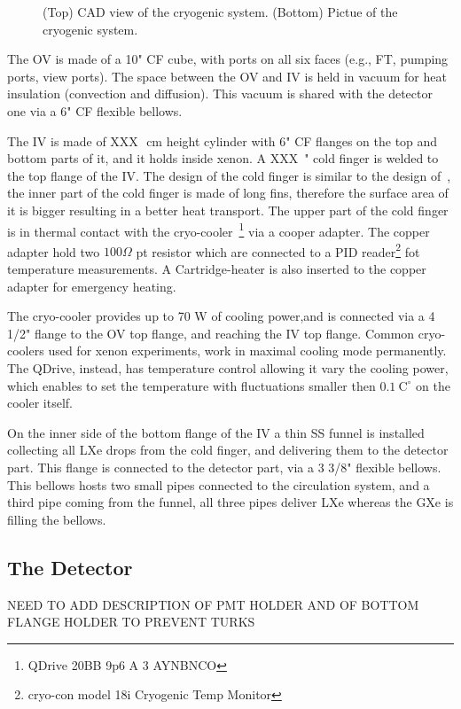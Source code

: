 \begin{figure}
\begin{subfigure}[b]{0.25\textheight}
    \end{subfigure}
        \caption{(Top) CAD view of the cryogenic system. (Bottom) Pictue of the cryogenic system. \label{fig:cryo}}
\end{figure}


The OV is made of a 10" CF cube, with ports on all six faces (e.g., FT, pumping ports, view ports). The space between the OV and IV is held in vacuum for heat insulation (convection and diffusion). This vacuum is shared with the detector one via a 6" CF flexible bellows.

The IV is made of XXX~\,cm height cylinder with 6" CF flanges on the top and bottom parts of it, and it holds inside xenon. A XXX~" cold finger is welded to the top flange of the IV. The design of the cold finger is similar to the design of~\cite{xe100_instr2012}, the inner part of the cold finger is made of long fins, therefore the surface area of it is bigger resulting in a better heat transport. The upper part of the cold finger is in thermal contact with the cryo-cooler~\footnote{QDrive 20BB 9p6 A 3 AYNBNCO} via a cooper adapter. The copper adapter hold two $100\Omega$ pt resistor which are connected to a PID reader\footnote{cryo-con model 18i Cryogenic Temp Monitor} fot temperature measurements. A Cartridge-heater is also inserted to the copper adapter for emergency heating. 

The cryo-cooler provides up to 70 W of cooling power,and is connected via a 4 1/2" flange to the OV top flange, and reaching the IV top flange. Common cryo-coolers used for xenon experiments, work in maximal cooling mode permanently. The QDrive, instead, has temperature control allowing it vary the cooling power, which enables to set the temperature with fluctuations smaller then $0.1~\mathrm{C^{\circ}}$ on the cooler itself.

On the inner side of the bottom flange of the IV a thin SS funnel is installed collecting all LXe drops from the cold finger, and delivering them to the  detector part. This flange is connected to the detector part, via a 3 3/8" flexible bellows. This bellows hosts two small pipes connected to the circulation system, and a third pipe coming from the funnel, all three pipes deliver LXe whereas the GXe is filling the bellows.

\subsection{The Detector}
\label{subsec:det}
NEED TO ADD DESCRIPTION OF PMT HOLDER AND OF BOTTOM FLANGE HOLDER TO PREVENT TURKS 


